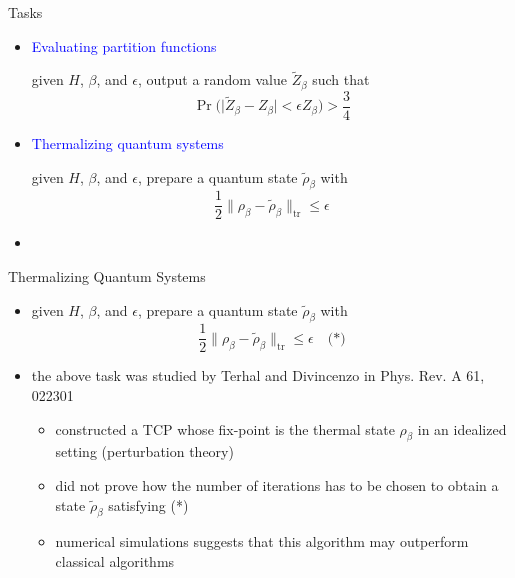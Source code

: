\documentclass[slideColor]{prosper}
\renewcommand{\>}{\rangle}
\newcommand{\<}{\langle}
\begin{document}
\begin{slide}{Tasks}
\begin{itemize}
\item \textcolor{blue}{Evaluating partition functions}

\medskip\noindent
given $H$, $\beta$, and $\epsilon$, output a random value $\tilde{Z}_\beta$ such that
\[
\Pr \Big( \big| \tilde{Z}_\beta - Z_\beta \big| < \epsilon Z_\beta \big) > \frac{3}{4}
\]

\bigskip
\item \textcolor{blue}{Thermalizing quantum systems}

\medskip\noindent
given $H$, $\beta$, and $\epsilon$, prepare a quantum state $\tilde{\rho}_\beta$ with
\[
\frac{1}{2} \| \rho_\beta - \tilde{\rho}_\beta \|_{\mathrm{tr}} \le \epsilon 
\]

\bigskip
\item
\end{itemize}
\end{slide}


\begin{slide}{Thermalizing Quantum Systems}
\begin{itemize}
\item given $H$, $\beta$, and $\epsilon$, prepare a quantum state $\tilde{\rho}_\beta$ with
\[
\frac{1}{2} \| \rho_\beta - \tilde{\rho}_\beta \|_{\mathrm{tr}} \le \epsilon \quad \mbox{(*)}
\]

\item the above task was studied by Terhal and Divincenzo in Phys. Rev. A 61, 022301

\begin{itemize}
\item constructed a TCP whose fix-point is the thermal state $\rho_\beta$ in an idealized
setting (perturbation theory)

\medskip
\item 
did not prove how the number of iterations has to be chosen to obtain a state $\tilde{\rho}_\beta$ satisfying (*)

\medskip
\item numerical simulations suggests that this algorithm may outperform classical algorithms
\end{itemize}
\end{itemize}
\end{slide}

\end{document}
